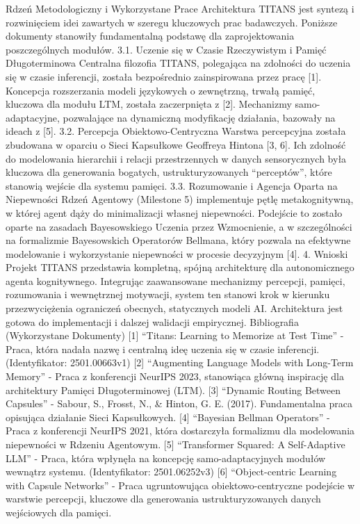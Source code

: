 \documentclass[letterpaper,twocolumn]{article}
\begin{document}
Rdzeń Metodologiczny i Wykorzystane Prace Architektura TITANS jest
syntezą i rozwinięciem idei zawartych w szeregu kluczowych prac
badawczych. Poniższe dokumenty stanowiły fundamentalną podstawę dla
zaprojektowania poszczególnych modułów. 3.1. Uczenie się w Czasie
Rzeczywistym i Pamięć Długoterminowa Centralna filozofia TITANS,
polegająca na zdolności do uczenia się w czasie inferencji, została
bezpośrednio zainspirowana przez pracę {[}1{]}. Koncepcja rozszerzania
modeli językowych o zewnętrzną, trwałą pamięć, kluczowa dla modułu LTM,
została zaczerpnięta z {[}2{]}. Mechanizmy samo-adaptacyjne, pozwalające
na dynamiczną modyfikację działania, bazowały na ideach z {[}5{]}. 3.2.
Percepcja Obiektowo-Centryczna Warstwa percepcyjna została zbudowana w
oparciu o Sieci Kapsułkowe Geoffreya Hintona {[}3, 6{]}. Ich zdolność do
modelowania hierarchii i relacji przestrzennych w danych sensorycznych
była kluczowa dla generowania bogatych, ustrukturyzowanych
``perceptów'', które stanowią wejście dla systemu pamięci. 3.3.
Rozumowanie i Agencja Oparta na Niepewności Rdzeń Agentowy (Milestone 5)
implementuje pętlę metakognitywną, w której agent dąży do minimalizacji
własnej niepewności. Podejście to zostało oparte na zasadach
Bayesowskiego Uczenia przez Wzmocnienie, a w szczególności na
formalizmie Bayesowskich Operatorów Bellmana, który pozwala na efektywne
modelowanie i wykorzystanie niepewności w procesie decyzyjnym {[}4{]}.
4. Wnioski Projekt TITANS przedstawia kompletną, spójną architekturę dla
autonomicznego agenta kognitywnego. Integrując zaawansowane mechanizmy
percepcji, pamięci, rozumowania i wewnętrznej motywacji, system ten
stanowi krok w kierunku przezwyciężenia ograniczeń obecnych, statycznych
modeli AI. Architektura jest gotowa do implementacji i dalszej walidacji
empirycznej. Bibliografia (Wykorzystane Dokumenty) {[}1{]} ``Titans:
Learning to Memorize at Test Time'' - Praca, która nadała nazwę i
centralną ideę uczenia się w czasie inferencji. (Identyfikator:
2501.00663v1) {[}2{]} ``Augmenting Language Models with Long-Term
Memory'' - Praca z konferencji NeurIPS 2023, stanowiąca główną
inspirację dla architektury Pamięci Długoterminowej (LTM). {[}3{]}
``Dynamic Routing Between Capsules'' - Sabour, S., Frosst, N., \&
Hinton, G. E. (2017). Fundamentalna praca opisująca działanie Sieci
Kapsułkowych. {[}4{]} ``Bayesian Bellman Operators'' - Praca z
konferencji NeurIPS 2021, która dostarczyła formalizmu dla modelowania
niepewności w Rdzeniu Agentowym. {[}5{]} ``Transformer Squared: A
Self-Adaptive LLM'' - Praca, która wpłynęła na koncepcję
samo-adaptacyjnych modułów wewnątrz systemu. (Identyfikator:
2501.06252v3) {[}6{]} ``Object-centric Learning with Capsule Networks''
- Praca ugruntowująca obiektowo-centryczne podejście w warstwie
percepcji, kluczowe dla generowania ustrukturyzowanych danych
wejściowych dla pamięci.
\end{document}
